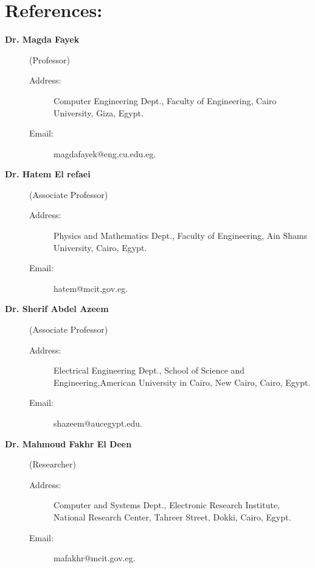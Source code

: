 \documentclass{article}
\begin{document}
\section*{References:}
\begin{description}

\item[\textbf{Dr. Magda Fayek}] (Professor)

\begin{description}
  \item[Address:]Computer Engineering Dept., Faculty of Engineering, Cairo University, Giza, Egypt.
  \item[Email:] magdafayek@eng.cu.edu.eg.
\end{description}
\item[\textbf{Dr. Hatem El refaei}] (Associate Professor)

\begin{description}
  \item[Address:]Physics and Mathematics Dept., Faculty of Engineering, Ain Shams University, Cairo, Egypt.
  \item[Email:]hatem@mcit.gov.eg.
\end{description}


\item[\textbf{Dr. Sherif Abdel Azeem}] (Associate Professor)

\begin{description}
  \item[Address:]Electrical Engineering Dept., School of Science and Engineering,American University in Cairo, New Cairo, Cairo, Egypt.
  \item[Email:]  shazeem@aucegypt.edu.
\end{description}

\item[ \textbf{Dr. Mahmoud Fakhr El Deen}] (Researcher)

 \begin{description}
  \item[Address:]Computer and Systems Dept., Electronic Research Institute,
  National Research Center, Tahreer Street, Dokki, Cairo, Egypt.
  \item[Email:]mafakhr@mcit.gov.eg.
\end{description}
\end{description}
\end{document}
